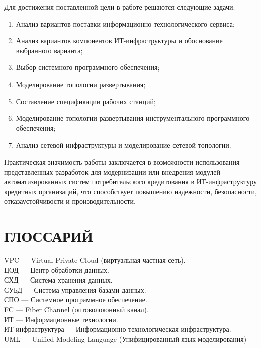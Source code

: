 \documentclass[14pt, a4paper]{extarticle}
\begin{document}
Для достижения поставленной цели в работе решаются следующие задачи:

\begin{enumerate}
  \item Анализ вариантов поставки информационно-технологического сервиса;
  \item Анализ вариантов компонентов ИТ-инфраструктуры и обоснование выбранного варианта;
  \item Выбор системного программного обеспечения;
  \item Моделирование топологии развертывания;
  \item Составление спецификации рабочих станций;
  \item Моделирование топологии развертывания инструментального программного обеспечения;
  \item Анализ сетевой инфраструктуры и моделирование сетевой топологии.
\end{enumerate}

Практическая значимость работы заключается в возможности использования представленных
разработок для модернизации или внедрения модулей автоматизированных систем
потребительского кредитования в ИТ-инфраструктуру кредитных организаций, что
способствует повышению надежности, безопасности, отказаустойчивости и производительности.

\section*{ГЛОССАРИЙ}
{}
\begin{raggedright}
  VPC --- Virtual Private Cloud (виртуальная частная сеть). \\
  ЦОД --- Центр обработки данных. \\
  СХД --- Система хранения данных. \\
  СУБД --- Система управления базами данных. \\
  СПО --- Системное программное обеспечение. \\
  FC --- Fiber Channel (оптоволоконный канал). \\
  ИТ --- Информационные технологии. \\
  ИТ-инфраструктура --- Информационно-технологическая инфраструктура. \\
  UML --- Unified Modeling Language (Унифицированный язык моделирования) \\
\end{raggedright}
\end{document}
